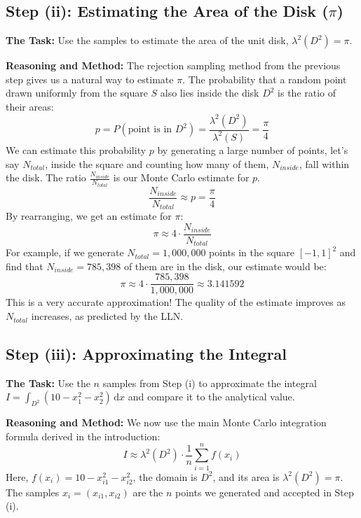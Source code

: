 \documentclass[11pt,a4paper]{article}
\newcommand{\dd}{\,\mathrm{d}}
\begin{document}
\subsection{Step (ii): Estimating the Area of the Disk ($\pi$)}
\label{sec:area}

\textbf{The Task:} Use the samples to estimate the area of the unit disk, $\lambda^2(D^2) = \pi$.

\textbf{Reasoning and Method:}
The rejection sampling method from the previous step gives us a natural way to estimate $\pi$. The probability that a random point drawn uniformly from the square $S$ also lies inside the disk $D^2$ is the ratio of their areas:
\[
p = P(\text{point is in } D^2) = \frac{\lambda^2(D^2)}{\lambda^2(S)} = \frac{\pi}{4}
\]
We can estimate this probability $p$ by generating a large number of points, let's say $N_{total}$, inside the square and counting how many of them, $N_{inside}$, fall within the disk. The ratio $\frac{N_{inside}}{N_{total}}$ is our Monte Carlo estimate for $p$.
\[
\frac{N_{inside}}{N_{total}} \approx p = \frac{\pi}{4}
\]
By rearranging, we get an estimate for $\pi$:
\[
\pi \approx 4 \cdot \frac{N_{inside}}{N_{total}}
\]
For example, if we generate $N_{total} = 1,000,000$ points in the square $[-1,1]^2$ and find that $N_{inside} = 785,398$ of them are in the disk, our estimate would be:
\[
\pi \approx 4 \cdot \frac{785,398}{1,000,000} \approx 3.141592
\]
This is a very accurate approximation! The quality of the estimate improves as $N_{total}$ increases, as predicted by the LLN.

\subsection{Step (iii): Approximating the Integral}
\label{sec:integral}

\textbf{The Task:} Use the $n$ samples from Step (i) to approximate the integral $I = \int_{D^2} (10 - x_1^2 - x_2^2) \dd x$ and compare it to the analytical value.

\textbf{Reasoning and Method:}
We now use the main Monte Carlo integration formula derived in the introduction:
\[
I \approx \lambda^2(D^2) \cdot \frac{1}{n} \sum_{i=1}^n f(x_i)
\]
Here, $f(x_i) = 10 - x_{i1}^2 - x_{i2}^2$, the domain is $D^2$, and its area is $\lambda^2(D^2) = \pi$. The samples $x_i = (x_{i1}, x_{i2})$ are the $n$ points we generated and accepted in Step (i).
\end{document}
